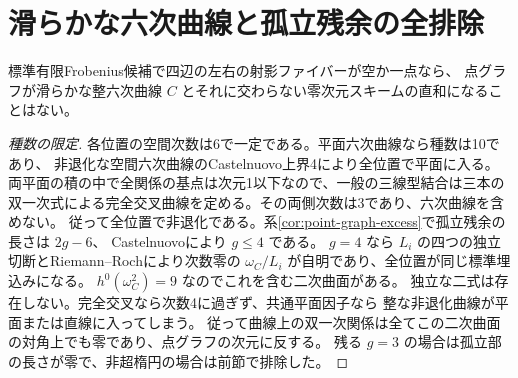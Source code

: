 \section{滑らかな六次曲線と孤立残余の全排除}
\label{sec:smooth-sextic-exclusion}
\begin{theorem}\label{thm:smooth-sextic-exclusion}
標準有限Frobenius候補で四辺の左右の射影ファイバーが空か一点なら、
点グラフが滑らかな整六次曲線 $C$ とそれに交わらない零次元スキームの直和になることはない。
\end{theorem}
\begin{proof}[種数の限定]
各位置の空間次数は6で一定である。平面六次曲線なら種数は10であり、
非退化な空間六次曲線のCastelnuovo上界4により全位置で平面に入る。
両平面の積の中で全関係の基点は次元1以下なので、一般の三線型結合は三本の
双一次式による完全交叉曲線を定める。その両側次数は3であり、六次曲線を含めない。
従って全位置で非退化である。系\ref{cor:point-graph-excess}で孤立残余の長さは $2g-6$、
Castelnuovoにより $g\le4$ である。
$g=4$ なら $L_i$ の四つの独立切断とRiemann--Rochにより次数零の
$\omega_C/L_i$ が自明であり、全位置が同じ標準埋込みになる。
$h^0(\omega_C^2)=9$ なのでこれを含む二次曲面がある。
独立な二式は存在しない。完全交叉なら次数4に過ぎず、共通平面因子なら
整な非退化曲線が平面または直線に入ってしまう。
従って曲線上の双一次関係は全てこの二次曲面の対角上でも零であり、点グラフの次元に反する。
残る $g=3$ の場合は孤立部の長さが零で、非超楕円の場合は前節で排除した。
\end{proof}

